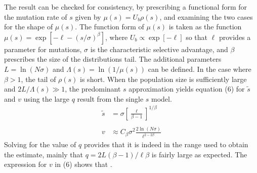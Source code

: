 \documentclass[12pt, one column]{article}
\begin{document}
The result can be checked for consistency, by prescribing a functional form for the mutation rate of $s$ given by $\mu(s)=U_b \rho(s)$, and examining the two cases for the shape of $\mu(s)$.  The function form of $\mu(s)$ is taken as the function $\mu(s) = \exp[-\ell - (s/\sigma)^\beta]$, where $U_b \propto \exp[-\ell]$ so that $\ell$ provides a parameter for mutations, $\sigma$ is the characteristic selective advantage, and $\beta $ prescribes the size of the distributions tail.  The additional parameters $L=\ln(N\sigma)$ and $\Lambda(s)= \ln(1/\mu(s))$ can be defined.  In the case where $\beta > 1$, the tail of $\rho(s)$ is short.  When the population size is sufficiently large and $2L/\Lambda(s)\gg 1$, the predominant $s$ approximation yields equation (6) for $\tilde{s}$ and $v$ using the large $q$ result from the single $s$ model.
\begin{equation}
\begin{aligned}
\tilde{s} &= \sigma\left[ \frac{\ell}{\beta-1} \right]^{1/\beta}\\
\\
v & \approx C_\beta \sigma^2 \frac{2 \ln(N\sigma)}{\ell^{2-2\beta}}
\end{aligned}
\end{equation}
Solving for the value of $q$ provides that it is indeed in the range used to obtain the estimate, mainly that $q=2L(\beta-1)/\ell \beta$ is fairly large as expected.  The expression for $v$ in (6) shows that  .  
\end{document}
